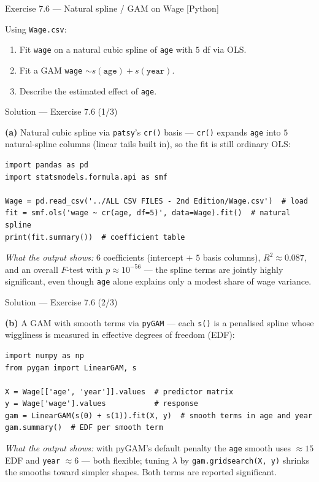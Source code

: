 \documentclass[aspectratio=169,11pt]{beamer}
\begin{document}
\begin{frame}[fragile]{Exercise 7.6 --- Natural spline / GAM on Wage [Python]}
\begin{exercise}
Using \texttt{Wage.csv}:
\begin{enumerate}
  \item Fit \texttt{wage} on a natural cubic spline of \texttt{age} with $5$ df via OLS.
  \item Fit a GAM \texttt{wage} $\sim s(\texttt{age})+s(\texttt{year})$.
  \item Describe the estimated effect of \texttt{age}.
\end{enumerate}
\end{exercise}
\end{frame}

\begin{frame}[fragile]{Solution --- Exercise 7.6 (1/3)}
\begin{solutionbox}
\textbf{(a)} Natural cubic spline via \texttt{patsy}'s \texttt{cr()} basis --- \texttt{cr()} expands \texttt{age} into $5$ natural-spline columns (linear tails built in), so the fit is still ordinary OLS:
\begin{lstlisting}
import pandas as pd
import statsmodels.formula.api as smf

Wage = pd.read_csv('../ALL CSV FILES - 2nd Edition/Wage.csv')  # load
fit = smf.ols('wage ~ cr(age, df=5)', data=Wage).fit()  # natural spline
print(fit.summary())  # coefficient table
\end{lstlisting}
\emph{What the output shows:} $6$ coefficients (intercept $+$ $5$ basis columns), $R^2\approx0.087$, and an overall $F$-test with $p\approx10^{-56}$ --- the spline terms are jointly highly significant, even though \texttt{age} alone explains only a modest share of wage variance.
\end{solutionbox}
\end{frame}

\begin{frame}[fragile]{Solution --- Exercise 7.6 (2/3)}
\begin{solutionbox}
\textbf{(b)} A GAM with smooth terms via \texttt{pyGAM} --- each \texttt{s()} is a penalised spline whose wiggliness is measured in effective degrees of freedom (EDF):
\begin{lstlisting}
import numpy as np
from pygam import LinearGAM, s

X = Wage[['age', 'year']].values  # predictor matrix
y = Wage['wage'].values           # response
gam = LinearGAM(s(0) + s(1)).fit(X, y)  # smooth terms in age and year
gam.summary()  # EDF per smooth term
\end{lstlisting}
\emph{What the output shows:} with pyGAM's default penalty the \texttt{age} smooth uses $\approx15$ EDF and \texttt{year} $\approx6$ --- both flexible; tuning $\lambda$ by \texttt{gam.gridsearch(X, y)} shrinks the smooths toward simpler shapes. Both terms are reported significant.
\end{solutionbox}
\end{frame}
\end{document}
